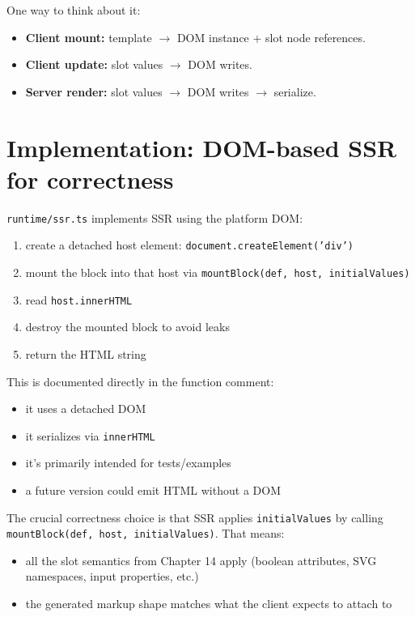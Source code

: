 One way to think about it:

\begin{itemize}
  \item \textbf{Client mount:} template \(\rightarrow\) DOM instance \(+\) slot node references.
  \item \textbf{Client update:} slot values \(\rightarrow\) DOM writes.
  \item \textbf{Server render:} slot values \(\rightarrow\) DOM writes \(\rightarrow\) serialize.
\end{itemize}

\section{Implementation: DOM-based SSR for correctness}

\texttt{runtime/ssr.ts} implements SSR using the platform DOM:

\begin{enumerate}
  \item create a detached host element: \texttt{document.createElement('div')}
  \item mount the block into that host via \texttt{mountBlock(def, host, initialValues)}
  \item read \texttt{host.innerHTML}
  \item destroy the mounted block to avoid leaks
  \item return the HTML string
\end{enumerate}

This is documented directly in the function comment:

\begin{itemize}
  \item it uses a detached DOM
  \item it serializes via \texttt{innerHTML}
  \item it’s primarily intended for tests/examples
  \item a future version could emit HTML without a DOM
\end{itemize}

The crucial correctness choice is that SSR applies \texttt{initialValues} by calling \texttt{mountBlock(def, host, initialValues)}.
That means:

\begin{itemize}
  \item all the slot semantics from Chapter 14 apply (boolean attributes, SVG namespaces, input properties, etc.)
  \item the generated markup shape matches what the client expects to attach to
\end{itemize}

